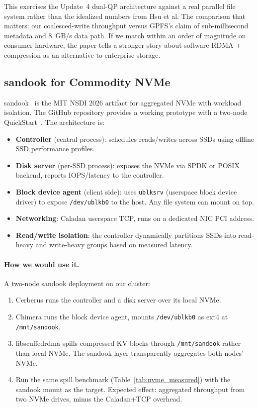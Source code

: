 \documentclass[11pt,letterpaper]{article}
\begin{document}
This exercises the Update~4 dual-QP architecture against a real parallel file system rather than the idealized numbers from Hsu et al. The comparison that matters: our coalesced-write throughput versus GPFS's claim of sub-millisecond metadata and 8~GB/s data path. If we match within an order of magnitude on consumer hardware, the paper tells a stronger story about software-RDMA + compression as an alternative to enterprise storage.

\subsection{sandook for Commodity NVMe}

sandook~\cite{sandook2026} is the MIT NSDI 2026 artifact for aggregated NVMe with workload isolation. The GitHub repository provides a working prototype with a two-node QuickStart~\cite{sandook_quickstart}. The architecture is:

\begin{itemize}
\item \textbf{Controller} (central process): schedules reads/writes across SSDs using offline SSD performance profiles.
\item \textbf{Disk server} (per-SSD process): exposes the NVMe via SPDK or POSIX backend, reports IOPS/latency to the controller.
\item \textbf{Block device agent} (client side): uses \texttt{ublksrv} (userspace block device driver) to expose \texttt{/dev/ublkb0} to the host. Any file system can mount on top.
\item \textbf{Networking}: Caladan userspace TCP, runs on a dedicated NIC PCI address.
\item \textbf{Read/write isolation}: the controller dynamically partitions SSDs into read-heavy and write-heavy groups based on measured latency.
\end{itemize}

\paragraph{How we would use it.} A two-node sandook deployment on our cluster:

\begin{enumerate}
\item Cerberus runs the controller and a disk server over its local NVMe.
\item Chimera runs the block device agent, mounts \texttt{/dev/ublkb0} as ext4 at \texttt{/mnt/sandook}.
\item libscuffedrdma spills compressed KV blocks through \texttt{/mnt/sandook} rather than local NVMe. The sandook layer transparently aggregates both nodes' NVMe.
\item Run the same spill benchmark (Table~\ref{tab:nvme_measured}) with the sandook mount as the target. Expected effect: aggregated throughput from two NVMe drives, minus the Caladan+TCP overhead.
\end{enumerate}
\end{document}
